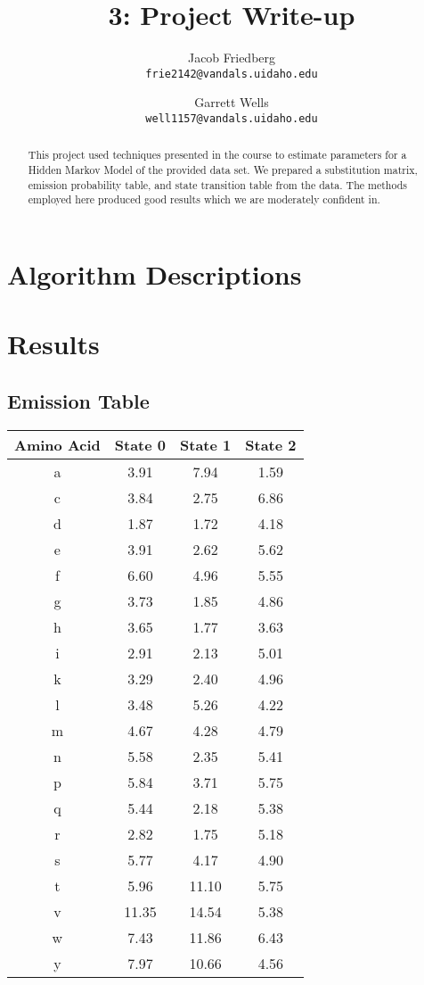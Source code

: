 \documentclass{article}
\title{3: Project Write-up}
\author{
Jacob Friedberg \\
\texttt{frie2142@vandals.uidaho.edu}
\and
Garrett Wells \\
\texttt{well1157@vandals.uidaho.edu}
}
\begin{document}
\maketitle
\begin{abstract}
    This project used techniques presented in the course to estimate parameters for a Hidden Markov Model of the provided data set. We prepared a substitution matrix, emission probability table, and state transition table from the data. The methods employed here produced good results which we are moderately confident in.
\end{abstract}

\section{Algorithm Descriptions}


\section{Results}


\subsection{Emission Table}

\begin{tabular}{c  c  c  c}
    Amino Acid & State 0 & State 1 & State 2 \\
    \hline
    a & 3.91 & 7.94 & 1.59 \\
    \hline
    c & 3.84 & 2.75 & 6.86 \\
    \hline
    d & 1.87 & 1.72 & 4.18 \\
    \hline
    e & 3.91 & 2.62 & 5.62 \\
    \hline
    f & 6.60 & 4.96 & 5.55 \\
    \hline
    g & 3.73 & 1.85 & 4.86 \\
    \hline
    h & 3.65 & 1.77 & 3.63 \\
    \hline
    i & 2.91 & 2.13 & 5.01 \\
    \hline
    k & 3.29 & 2.40 & 4.96 \\
    \hline
    l & 3.48 & 5.26 & 4.22 \\
    \hline
    m & 4.67 & 4.28 & 4.79 \\
    \hline
    n & 5.58 & 2.35 & 5.41 \\
    \hline
    p & 5.84 & 3.71 & 5.75 \\
    \hline
    q & 5.44 & 2.18 & 5.38 \\
    \hline
    r & 2.82 & 1.75 & 5.18 \\
    \hline
    s & 5.77 & 4.17 & 4.90 \\
    \hline
    t & 5.96 & 11.10 & 5.75 \\
    \hline
    v & 11.35 & 14.54 & 5.38 \\
    \hline
    w & 7.43 & 11.86 & 6.43 \\
    \hline
    y & 7.97 & 10.66 & 4.56 \\
    \hline
\end{tabular}
\end{document}
